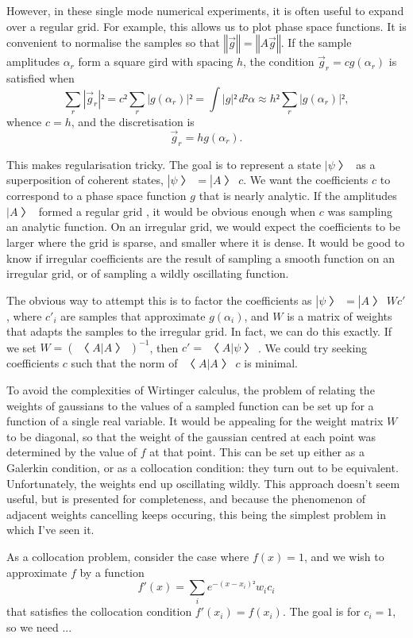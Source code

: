 However, in these single mode numerical experiments, it is often useful to expand over a regular grid.  For example, this allows us to plot phase space functions.  It is convenient to normalise the samples so that $‖\vec g‖=‖A\vec g‖$.  If the sample amplitudes $α_r$ form a square gird with spacing $h$, the condition $\vec g_r=cg(α_r)$ is satisfied when
$$∑_r|\vec g_r|²=c²∑_r|g(α_r)|²=\int |g|²\,d²α≈h²∑_r|g(α_r)|²,$$
whence $c=h$, and the discretisation is
$$\vec g_r=hg(α_r).$$

This makes regularisation tricky.  The goal is to represent a state $|ψ〉$ as a superposition of coherent states, $|ψ〉=|A〉 c$.  We want the coefficients $c$ to correspond to a phase space function $g$ that is nearly analytic.  If the amplitudes $|A〉$ formed a regular grid , it would be obvious enough when $c$ was sampling an analytic function.  On an irregular grid, we would expect the coefficients to be larger where the grid is sparse, and smaller where it is dense.  It would be good to know if irregular coefficients are the result of sampling a smooth function on an irregular grid, or of sampling a wildly oscillating function.

The obvious way to attempt this is to factor the coefficients as $|ψ〉=|A〉 Wc'$, where $c'_i$ are samples that approximate $g(α_i)$, and $W$ is a matrix of weights that adapts the samples to the irregular grid.  In fact, we can do this exactly.  If we set $W=(〈 A|A〉)^{-1}$, then $c'=〈 A|ψ〉$.  We could try seeking coefficients $c$ such that the norm of $〈 A|A〉 c$ is minimal.

To avoid the complexities of Wirtinger calculus, the problem of relating the weights of gaussians to the values of a sampled function can be set up for a function of a single real variable.  It would be appealing for the weight matrix $W$ to be diagonal, so that the weight of the gaussian centred at each point was determined by the value of $f$ at that point.  This can be set up either as a Galerkin condition, or as a collocation condition: they turn out to be equivalent.  Unfortunately, the weights end up oscillating wildly.  This approach doesn't seem useful, but is presented for completeness, and because the phenomenon of adjacent weights cancelling keeps occuring, this being the simplest problem in which I've seen it.

As a collocation problem, consider the case where $f(x)=1$, and we wish to approximate $f$ by a function 
$$f'(x)=∑_i e^{-(x-x_i)²}w_ic_i$$
that satisfies the collocation condition $f'(x_i)=f(x_i)$.  The goal is for $c_i=1$, so we need ...

